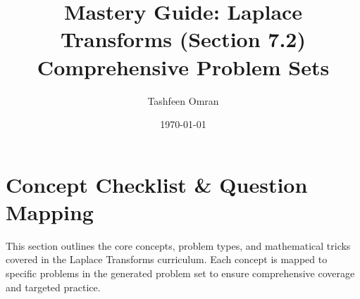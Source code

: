 \documentclass[11pt, letterpaper]{article}
\theoremstyle{definition}
\theoremstyle{remark}
\begin{document}
\title{\textbf{Mastery Guide: Laplace Transforms (Section 7.2)\\Comprehensive Problem Sets}}
\author{Tashfeen Omran}
\date{\today}
\maketitle

\tableofcontents
\newpage

\section{Concept Checklist \& Question Mapping}

This section outlines the core concepts, problem types, and mathematical tricks covered in the Laplace Transforms curriculum. Each concept is mapped to specific problems in the generated problem set to ensure comprehensive coverage and targeted practice.
\end{document}
